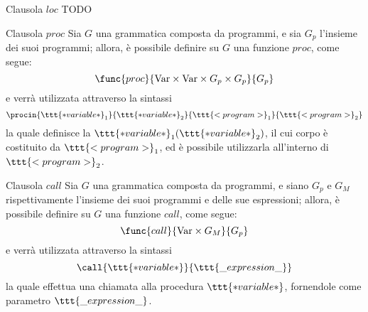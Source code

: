 \documentclass[a4paper, 12pt]{report}
\begin{document}
    \begin{frameddefn}{Clausola $loc$}
        TODO
    \end{frameddefn}

    \begin{frameddefn}{Clausola $proc$}
        Sia $G$ una grammatica composta da programmi, e sia $G_p$ l'insieme dei suoi programmi; allora, è possibile definire su $G$ una funzione $proc$, come segue: $$\func{proc}{\mathrm{Var} \times \mathrm{Var} \times G_p \times G_p}{G_p}$$ e verrà utilizzata attraverso la sintassi $$\procin{\ttt{*variable*}_1}{\ttt{*variable*}_2}{\ttt{<program>}_1}{\ttt{<program>}_2}$$ la quale definisce la  $\ttt{*variable*}_1(\ttt{*variable*}_2)$, il cui corpo è costituito da $\ttt{<program>}_1$, ed è possibile utilizzarla all'interno di $\ttt{<program>}_2$.
    \end{frameddefn}

    \begin{frameddefn}{Clausola $call$}
        Sia $G$ una grammatica composta da programmi, e siano $G_p$ e $G_M$ rispettivamente l'insieme dei suoi programmi e delle sue espressioni; allora, è possibile definire su $G$ una funzione $call$, come segue: $$\func{call}{\mathrm{Var} \times G_M}{G_p}$$ e verrà utilizzata attraverso la sintassi $$\call{\ttt{*variable*}}{\ttt{\_expression\_}}$$ la quale effettua una chiamata alla procedura $\ttt{*variable*}$, fornendole come parametro $\ttt{\_expression\_}$.
    \end{frameddefn}
\end{document}
